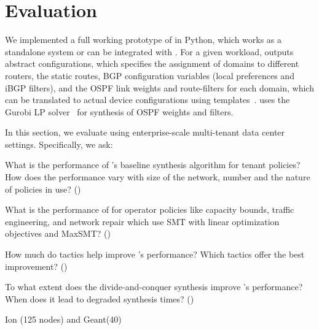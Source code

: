 \section{Evaluation}
 \label{sec:evaluation}
 
 We implemented a full working
 prototype of \name in Python, which works as a standalone
 system or can be integrated with \genesis. For a given
 workload, \name outputs abstract configurations, which
 specifies the assignment of domains to different routers,
 the static routes, BGP configuration variables (local 
 preferences and iBGP filters), and the OSPF link weights
 and route-filters for each domain, which can be 
 translated to actual device configurations using templates~\cite{template}.
 \name uses the Gurobi LP solver~\cite{gurobi} for synthesis of 
 OSPF weights and filters. 
 
In this section, we evaluate \Name using
enterprise-scale multi-tenant data
center settings. 
Specifically, we ask:
\begin{compactitemize}
	\item What is the performance of \Name's baseline synthesis
	algorithm for tenant policies? How does the performance vary with size of the
	network, number and the nature of policies in use? ()
	
	\item What is the performance of \name for operator policies
	like capacity bounds, traffic engineering, and network repair
	which use SMT with linear optimization objectives and MaxSMT? ()
	
	\item How much do tactics help improve \Name's 
	performance? Which tactics offer the best improvement? ()
	
	\item To what extent does the divide-and-conquer synthesis improve \Name's
	performance? When does it lead to degraded synthesis times? ()
	
\end{compactitemize}


Ion (125 nodes) and Geant(40)

